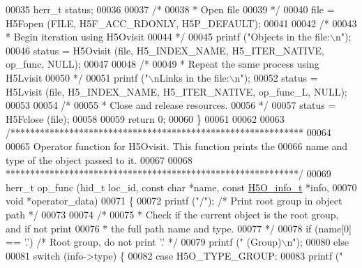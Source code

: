 \begin{DoxyCode}
00035     herr\_t          status;
00036 
00037     \textcolor{comment}{/*}
00038 \textcolor{comment}{     * Open file}
00039 \textcolor{comment}{     */}
00040     file = H5Fopen (FILE, H5F\_ACC\_RDONLY, H5P\_DEFAULT);
00041 
00042     \textcolor{comment}{/*}
00043 \textcolor{comment}{     * Begin iteration using H5Ovisit}
00044 \textcolor{comment}{     */}
00045     printf (\textcolor{stringliteral}{"Objects in the file:\(\backslash\)n"});
00046     status = H5Ovisit (file, H5\_INDEX\_NAME, H5\_ITER\_NATIVE, op\_func, NULL);
00047 
00048     \textcolor{comment}{/*}
00049 \textcolor{comment}{     * Repeat the same process using H5Lvisit}
00050 \textcolor{comment}{     */}
00051     printf (\textcolor{stringliteral}{"\(\backslash\)nLinks in the file:\(\backslash\)n"});
00052     status = H5Lvisit (file, H5\_INDEX\_NAME, H5\_ITER\_NATIVE, op\_func\_L, NULL);
00053 
00054     \textcolor{comment}{/*}
00055 \textcolor{comment}{     * Close and release resources.}
00056 \textcolor{comment}{     */}
00057     status = H5Fclose (file);
00058 
00059     \textcolor{keywordflow}{return} 0;
00060 \}
00061 
00062 
00063 \textcolor{comment}{/************************************************************}
00064 \textcolor{comment}{}
00065 \textcolor{comment}{  Operator function for H5Ovisit.  This function prints the}
00066 \textcolor{comment}{  name and type of the object passed to it.}
00067 \textcolor{comment}{}
00068 \textcolor{comment}{ ************************************************************/}
00069 herr\_t op\_func (hid\_t loc\_id, \textcolor{keyword}{const} \textcolor{keywordtype}{char} *name, \textcolor{keyword}{const} \hyperlink{struct_h5_o__info__t}{H5O\_info\_t} *info,
00070             \textcolor{keywordtype}{void} *operator\_data)
00071 \{
00072     printf (\textcolor{stringliteral}{"/"});               \textcolor{comment}{/* Print root group in object path */}
00073 
00074     \textcolor{comment}{/*}
00075 \textcolor{comment}{     * Check if the current object is the root group, and if not print}
00076 \textcolor{comment}{     * the full path name and type.}
00077 \textcolor{comment}{     */}
00078     \textcolor{keywordflow}{if} (name[0] == \textcolor{charliteral}{'.'})         \textcolor{comment}{/* Root group, do not print '.' */}
00079         printf (\textcolor{stringliteral}{"  (Group)\(\backslash\)n"});
00080     \textcolor{keywordflow}{else}
00081         \textcolor{keywordflow}{switch} (info->type) \{
00082             \textcolor{keywordflow}{case} H5O\_TYPE\_GROUP:
00083                 printf (\textcolor{stringliteral}{"%
}
\end{DoxyCode}
